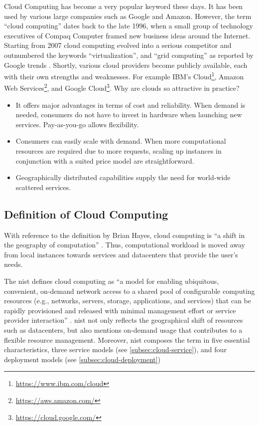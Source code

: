 Cloud Computing has become a very popular keyword these days. 
It has been used by various large companies such as Google and Amazon.
However, the term \enquote{cloud computing} dates back to the late 1996, when a small group of technology executives of Compaq Computer framed new business ideas around the Internet.\cite{regalado2020}
Starting from 2007 cloud computing evolved into a serious competitor and outnumbered the keywords \enquote{virtualization}, and \enquote{grid computing} as reported by Google trends \cite{Wang2010}.
Shortly, various cloud providers become publicly available, each with their own strengths and weaknesses.
For example IBM's Cloud\footnote{\url{https://www.ibm.com/cloud}}, Amazon Web Services\footnote{\url{https://aws.amazon.com/}}, and Google Cloud\footnote{\url{https://cloud.google.com/}}.
Why are clouds so attractive in practice?

\begin{itemize}
    \item It offers major advantages in terms of cost and reliability.
    When demand is needed, consumers do not have to invest in hardware when launching new services.
    Pay-as-you-go allows flexibility.
    \item Consumers can easily scale with demand.
    When more computational resources are required due to more requests, scaling up instances in conjunction with a suited price model are straightforward.
    \item Geographically distributed capabilities supply the need for world-wide scattered services.
\end{itemize}

\subsection{Definition of Cloud Computing}

With reference to the definition by Brian Hayes, cloud computing is \enquote{a shift in the geography of computation} \cite{hayes2008}.
Thus, computational workload is moved away from local instances towards services and datacenters that provide the user's needs\cite{Armbrust2010}.

The \ac{nist} defines cloud computing as \enquote{a model for enabling ubiquitous, convenient, on-demand network access to a shared pool of configurable computing resources (e.g., networks, servers, storage, applications, and services) that can be rapidly provisioned and released with minimal management effort or service provider interaction} \cite{Mell2011}.
\ac{nist} not only reflects the geographical shift of resources such as datacenters, but also mentions on-demand usage that contributes to a flexible resource management.
Moreover, \ac{nist} composes the term in five essential characteristics, three service models (see \autoref{subsec:cloud-service}), and four deployment models (see \autoref{subsec:cloud-deployment}) \cite{Mell2011}

